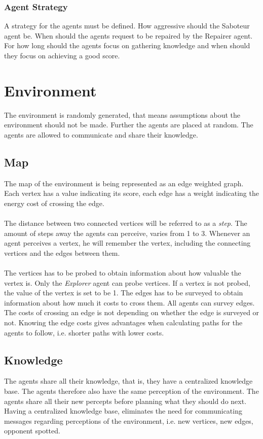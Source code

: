 \documentclass[11pt]{article}
\begin{document}
\subsubsection{Agent Strategy}
A strategy for the agents must be defined. How aggressive should the Saboteur agent be. When should the agents request to be repaired by the Repairer agent. For how long should the agents focus on gathering knowledge and when should they focus on achieving a good score.

\section{Environment}
The environment is randomly generated, that means assumptions about the environment should not be made. Further the agents are placed at random. The agents are allowed to communicate and share their knowledge.

\subsection{Map}
The map of the environment is being represented as an edge weighted graph. Each vertex has a value indicating its score, each edge has a weight indicating the energy cost of crossing the edge.\\
\\
The distance between two connected vertices will be referred to as a \emph{step}. The amount of steps away the agents can perceive, varies from 1 to 3. Whenever an agent perceives a vertex, he will remember the vertex, including the connecting vertices and the edges between them.\\
\\
The vertices has to be probed to obtain information about how valuable the vertex is. Only the \emph{Explorer} agent can probe vertices. If a vertex is not probed, the value of the vertex is set to be 1. The edges has to be surveyed to obtain information about how much it costs to cross them. All agents can survey edges. The costs of crossing an edge is not depending on whether the edge is surveyed or not. Knowing the edge costs gives advantages when calculating paths for the agents to follow, i.e. shorter paths with lower costs.

\subsection{Knowledge}
The agents share all their knowledge, that is, they have a centralized knowledge base. The agents therefore also have the same perception of the environment. The agents share all their new percepts before planning what they should do next. Having a centralized knowledge base, eliminates the need for communicating messages regarding perceptions of the environment, i.e. new vertices, new edges, opponent spotted.
\end{document}
